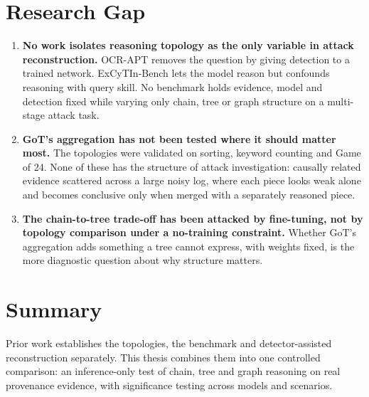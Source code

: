\section{Research Gap}
\begin{enumerate}
\item \textbf{No work isolates reasoning topology as the only variable in attack reconstruction.} OCR-APT removes the question by giving detection to a trained network. ExCyTIn-Bench lets the model reason but confounds reasoning with query skill. No benchmark holds evidence, model and detection fixed while varying only chain, tree or graph structure on a multi-stage attack task.
\item \textbf{GoT's aggregation has not been tested where it should matter most.} The topologies were validated on sorting, keyword counting and Game of 24. None of these has the structure of attack investigation: causally related evidence scattered across a large noisy log, where each piece looks weak alone and becomes conclusive only when merged with a separately reasoned piece.
\item \textbf{The chain-to-tree trade-off has been attacked by fine-tuning, not by topology comparison under a no-training constraint.} Whether GoT's aggregation adds something a tree cannot express, with weights fixed, is the more diagnostic question about why structure matters.
\end{enumerate}

\section{Summary}
Prior work establishes the topologies, the benchmark and detector-assisted reconstruction separately. This thesis combines them into one controlled comparison: an inference-only test of chain, tree and graph reasoning on real provenance evidence, with significance testing across models and scenarios.
